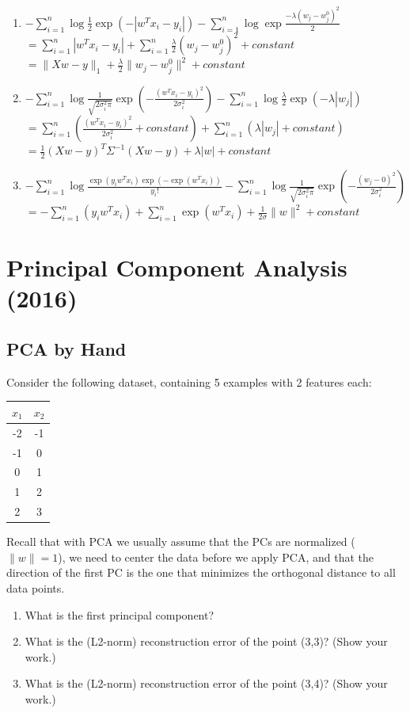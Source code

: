 \documentclass{article}
\def\blu#1{{\color{blu}#1}}
\def\norm#1{\|#1\|}
\def\enum#1{\begin{enumerate}#1\end{enumerate}}
\begin{document}
\enum{
\item $-\sum_{i=1}^n\log   \frac 1 2 \exp(-|w^Tx_i - y_i|)  -\sum_{i=1}^n\log \exp \frac{-\lambda(w_j -  w^0_j)^2}{2}$ \\
        $ =  \sum_{i=1}^n |w^Tx_i - y_i| +\sum_{i=1}^n  \frac{\lambda}{2}(w_j -  w^0_j)^2 + constant$\\
       $= \norm{Xw-y}_1 +  \frac{\lambda}{2} \norm{w_j -  w^0_j}^2 + constant$
\item  $-\sum_{i=1}^n\log  \frac{1}{\sqrt{2\sigma_i^2\pi}}\exp\left(-\frac{(w^Tx_i - y_i)^2}{2\sigma_i^2}\right) -\sum_{i=1}^n\log \frac{\lambda}{2}\exp(-\lambda|w_j|)  $\\
       $  =\sum_{i=1}^n( \frac{(w^Tx_i - y_i)^2}{2\sigma_i^2}+ constant) +  \sum_{i=1}^n (\lambda|w_j| +constant) $\\
       $ = \frac{1}{2}(Xw-y)^T \Sigma^{-1} (Xw-y) +\lambda|w|+ constant $
\item  $-\sum_{i=1}^n\log  \frac{\exp(y_iw^Tx_i)\exp(-\exp(w^Tx_i))}{y_i!} -\sum_{i=1}^n \log  \frac{1}{\sqrt{2\sigma_i^2\pi}}\exp\left(-\frac{(w_j - 0)^2}{2\sigma_i^2}\right)$\\
        $= -\sum_{i=1}^n (y_iw^Tx_i) + \sum_{i=1}^n \exp(w^Tx_i) +\frac{1}{2\sigma}\norm{w}^2+ constant$
}


\section{Principal Component Analysis (2016)}

\subsection{PCA by Hand}

Consider the following dataset, containing 5 examples with 2 features each:
\begin{center}
\begin{tabular}{cc}
$x_1$ & $x_2$\\
\hline
-2 & -1\\
-1 & 0\\
0 & 1\\
1 & 2\\
2 & 3\\
\end{tabular}
\end{center}
Recall that with PCA we usually assume that the PCs are normalized ($\norm{w} = 1$), we need to center the data before we apply PCA, and that the direction of the first PC is the one that minimizes the orthogonal distance to all data points.
\blu{
\enum{
\item What is the first principal component?
\item What is the (L2-norm) reconstruction error of the point (3,3)? (Show your work.)
\item What is the (L2-norm) reconstruction error of the point (3,4)? (Show your work.)
}
}
\end{document}
